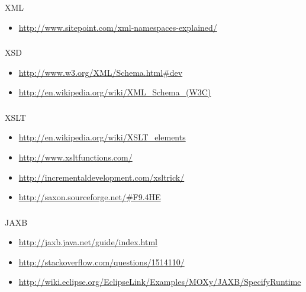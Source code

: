 \documentclass[handout]{beamer}
\begin{document}
\begin{frame}
	\frametitle{\insertsection}
	XML\\
	\begin{itemize}
		\item \url{http://www.sitepoint.com/xml-namespaces-explained/}{}
	\end{itemize}
\end{frame}

\begin{frame}
	\frametitle{\insertsection}
	XSD\\
	\begin{itemize}
		\item \url{http://www.w3.org/XML/Schema.html\#dev}{}
		\item \url{http://en.wikipedia.org/wiki/XML_Schema_(W3C)}{}
	\end{itemize}
\end{frame}

\begin{frame}
	\frametitle{\insertsection}
	XSLT\\
	\begin{itemize}
		\item \url{http://en.wikipedia.org/wiki/XSLT_elements}{}
		\item \url{http://www.xsltfunctions.com/}{}
		\item \url{http://incrementaldevelopment.com/xsltrick/}{}
		\item \url{http://saxon.sourceforge.net/\#F9.4HE}{}
	\end{itemize}
\end{frame}

\begin{frame}
	\frametitle{\insertsection}
	JAXB\\
	\begin{itemize}
		\item \url{http://jaxb.java.net/guide/index.html}
		\item \url{http://stackoverflow.com/questions/1514110/}
		\item \url{http://wiki.eclipse.org/EclipseLink/Examples/MOXy/JAXB/SpecifyRuntime}
	\end{itemize}
\end{frame}
\end{document}
